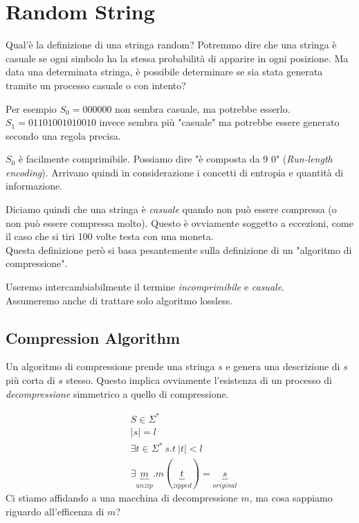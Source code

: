\documentclass{article}
\begin{document}
\section{Random String}
Qual'è la definizione di una stringa random? Potremmo dire che una stringa è casuale se ogni simbolo ha la stessa probabilità di apparire in ogni posizione. Ma data una determinata stringa, è possibile determinare se sia stata generata tramite un processo casuale o con intento?

Per esempio $S_0=000000$ non sembra casuale, ma potrebbe esserlo. $S_1=01101001010010$ invece sembra più "casuale" ma potrebbe essere generato secondo una regola precisa.

$S_0$ è facilmente comprimibile. Possiamo dire "è composta da 9 $0$" (\textit{Run-length encoding}). Arrivano quindi in considerazione i concetti di entropia e quantità di informazione.

Diciamo quindi che una stringa è \textit{casuale} quando non può essere compressa (o non può essere compressa molto). Questo è ovviamente soggetto a eccezioni, come il caso che si tiri 100 volte testa con una moneta. \\
Questa definizione però si basa pesantemente sulla definizione di un "algoritmo di compressione".

\begin{callout}{}
    Useremo intercambiabilmente il termine \textit{incomprimibile} e \textit{casuale}. \\
    Assumeremo anche di trattare solo algoritmo lossless.
\end{callout}

\subsection{Compression Algorithm}
Un algoritmo di compressione prende una stringa $s$ e genera una descrizione di $s$ più corta di $s$ stesso.
Questo implica ovviamente l'esistenza di un processo di \textit{decompressione} simmetrico a quello di compressione.

\begin{align*}
    & S\in\Sigma^* \\
    & |s| = l \\
    & \exists t \in \Sigma^*\ s.t\ |t|<l \\
    & \exists \underbrace{m}_{unzip}. m(\underbrace{t}_{zipped}) = \underbrace{s}_{original}
\end{align*}
Ci stiamo affidando a una macchina di decompressione $m$, ma cosa sappiamo riguardo all'efficenza di $m$?
\end{document}
